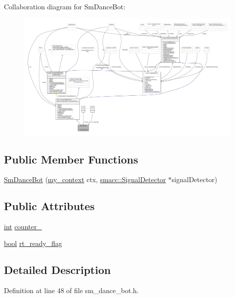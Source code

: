Collaboration diagram for Sm\+Dance\+Bot\+:
\nopagebreak
\begin{figure}[H]
\begin{center}
\leavevmode
\includegraphics[width=350pt]{structSmDanceBot__coll__graph}
\end{center}
\end{figure}
\subsection*{Public Member Functions}
\begin{DoxyCompactItemize}
\item 
\hyperlink{structSmDanceBot_a19d56ccf5c40bc65cb58be2e6c55d74c}{Sm\+Dance\+Bot} (\hyperlink{common_8h_af2dcacead80d69b96952496fe413bbfe}{my\+\_\+context} ctx, \hyperlink{classsmacc_1_1SignalDetector}{smacc\+::\+Signal\+Detector} $\ast$signal\+Detector)
\end{DoxyCompactItemize}
\subsection*{Public Attributes}
\begin{DoxyCompactItemize}
\item 
\hyperlink{classint}{int} \hyperlink{structSmDanceBot_a9125df831508b9d16e747993c546f771}{counter\+\_}
\item 
\hyperlink{classbool}{bool} \hyperlink{structSmDanceBot_a4943f893a4f3184a78cf379b143cc7ed}{rt\+\_\+ready\+\_\+flag}
\end{DoxyCompactItemize}


\subsection{Detailed Description}


Definition at line 48 of file sm\+\_\+dance\+\_\+bot.\+h.



